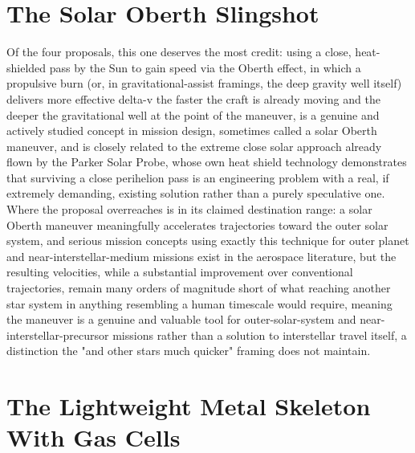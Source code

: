\documentclass[11pt]{article}
\begin{document}
\section{The Solar Oberth Slingshot}

Of the four proposals, this one deserves the most credit: using a close, heat-shielded pass by the Sun to gain speed via the Oberth effect, in which a propulsive burn (or, in gravitational-assist framings, the deep gravity well itself) delivers more effective delta-v the faster the craft is already moving and the deeper the gravitational well at the point of the maneuver, is a genuine and actively studied concept in mission design, sometimes called a solar Oberth maneuver, and is closely related to the extreme close solar approach already flown by the Parker Solar Probe, whose own heat shield technology demonstrates that surviving a close perihelion pass is an engineering problem with a real, if extremely demanding, existing solution rather than a purely speculative one. Where the proposal overreaches is in its claimed destination range: a solar Oberth maneuver meaningfully accelerates trajectories toward the outer solar system, and serious mission concepts using exactly this technique for outer planet and near-interstellar-medium missions exist in the aerospace literature, but the resulting velocities, while a substantial improvement over conventional trajectories, remain many orders of magnitude short of what reaching another star system in anything resembling a human timescale would require, meaning the maneuver is a genuine and valuable tool for outer-solar-system and near-interstellar-precursor missions rather than a solution to interstellar travel itself, a distinction the "and other stars much quicker" framing does not maintain.

\section{The Lightweight Metal Skeleton With Gas Cells}
\end{document}
